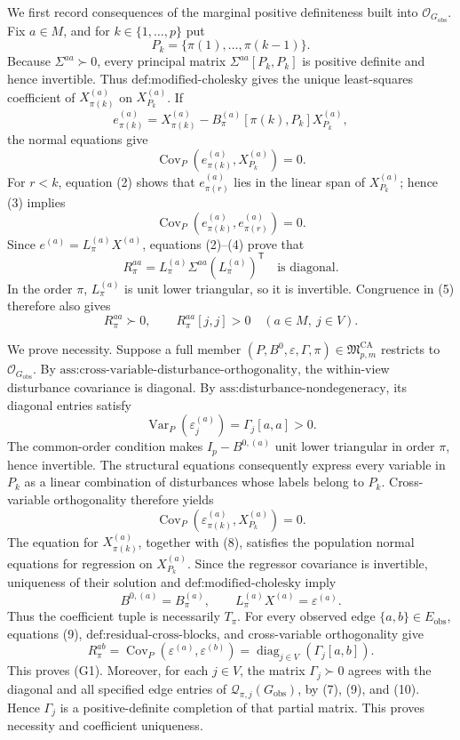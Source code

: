 We first record consequences of the marginal positive definiteness built into \(\mathcal O_{G_{\mathrm{obs}}}\).  Fix \(a\in M\), and for \(k\in\{1,\ldots,p\}\) put
\[
P_k=\{\pi(1),\ldots,\pi(k-1)\}.
\tag{1}
\]
Because \(\Sigma^{aa}\succ0\), every principal matrix \(\Sigma^{aa}[P_k,P_k]\) is positive definite and hence invertible.  Thus \(\text{def:modified-cholesky}\) gives the unique least-squares coefficient of \(X_{\pi(k)}^{(a)}\) on \(X_{P_k}^{(a)}\).  If
\[
e_{\pi(k)}^{(a)}
=X_{\pi(k)}^{(a)}
-B_\pi^{(a)}[\pi(k),P_k]X_{P_k}^{(a)},
\tag{2}
\]
the normal equations give
\[
\operatorname{Cov}_P\!\left(e_{\pi(k)}^{(a)},X_{P_k}^{(a)}\right)=0.
\tag{3}
\]
For \(r<k\), equation (2) shows that \(e_{\pi(r)}^{(a)}\) lies in the linear span of \(X_{P_k}^{(a)}\); hence (3) implies
\[
\operatorname{Cov}_P\!\left(e_{\pi(k)}^{(a)},e_{\pi(r)}^{(a)}\right)=0.
\tag{4}
\]
Since \(e^{(a)}=L_\pi^{(a)}X^{(a)}\), equations (2)--(4) prove that
\[
R_\pi^{aa}
=L_\pi^{(a)}\Sigma^{aa}(L_\pi^{(a)})^{\mathsf T}
\quad\text{is diagonal}.
\tag{5}
\]
In the order \(\pi\), \(L_\pi^{(a)}\) is unit lower triangular, so it is invertible.  Congruence in (5) therefore also gives
\[
R_\pi^{aa}\succ0,
\qquad R_\pi^{aa}[j,j]>0
\quad(a\in M,\ j\in V).
\tag{6}
\]

We prove necessity.  Suppose a full member \((P,B^0,\varepsilon,\Gamma,\pi)\in\mathfrak M_{p,m}^{\mathrm{CA}}\) restricts to \(\mathcal O_{G_{\mathrm{obs}}}\).  By \(\text{ass:cross-variable-disturbance-orthogonality}\), the within-view disturbance covariance is diagonal.  By \(\text{ass:disturbance-nondegeneracy}\), its diagonal entries satisfy
\[
\operatorname{Var}_P(\varepsilon_j^{(a)})
=\Gamma_j[a,a]>0.
\tag{7}
\]
The common-order condition makes \(I_p-B^{0,(a)}\) unit lower triangular in order \(\pi\), hence invertible.  The structural equations consequently express every variable in \(P_k\) as a linear combination of disturbances whose labels belong to \(P_k\).  Cross-variable orthogonality therefore yields
\[
\operatorname{Cov}_P\!\left(\varepsilon_{\pi(k)}^{(a)},X_{P_k}^{(a)}\right)=0.
\tag{8}
\]
The equation for \(X_{\pi(k)}^{(a)}\), together with (8), satisfies the population normal equations for regression on \(X_{P_k}^{(a)}\).  Since the regressor covariance is invertible, uniqueness of their solution and \(\text{def:modified-cholesky}\) imply
\[
B^{0,(a)}=B_\pi^{(a)},
\qquad
L_\pi^{(a)}X^{(a)}=\varepsilon^{(a)}.
\tag{9}
\]
Thus the coefficient tuple is necessarily \(T_\pi\).  For every observed edge \(\{a,b\}\in E_{\mathrm{obs}}\), equations (9), \(\text{def:residual-cross-blocks}\), and cross-variable orthogonality give
\[
R_\pi^{ab}
=\operatorname{Cov}_P(\varepsilon^{(a)},\varepsilon^{(b)})
=\operatorname{diag}_{j\in V}(\Gamma_j[a,b]).
\tag{10}
\]
This proves (G1).  Moreover, for each \(j\in V\), the matrix \(\Gamma_j\succ0\) agrees with the diagonal and all specified edge entries of \(\mathcal Q_{\pi,j}(G_{\mathrm{obs}})\), by (7), (9), and (10).  Hence \(\Gamma_j\) is a positive-definite completion of that partial matrix.  This proves necessity and coefficient uniqueness.


